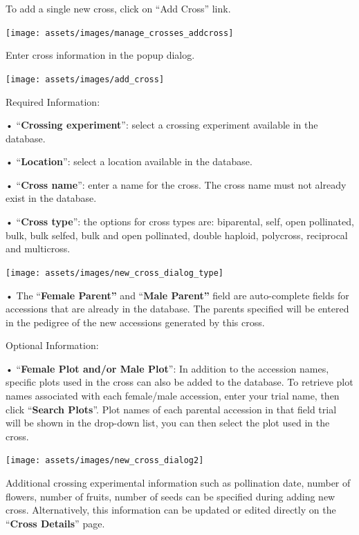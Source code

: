 \documentclass[
  12pt,
]{book}
\begin{document}
To add a single new cross, click on ``Add Cross'' link.

\begin{center}\texttt{[image: assets/images/manage\_crosses\_addcross]} \end{center}

Enter cross information in the popup dialog.

\begin{center}\texttt{[image: assets/images/add\_cross]} \end{center}

Required Information:

• ``\textbf{Crossing experiment}'': select a crossing experiment available in the database.

• ``\textbf{Location}'': select a location available in the database.

• ``\textbf{Cross name}'': enter a name for the cross. The cross name must not already exist in the database.

• ``\textbf{Cross type}'': the options for cross types are: biparental, self, open pollinated, bulk, bulk selfed, bulk and open pollinated, double haploid, polycross, reciprocal and multicross.

\begin{center}\texttt{[image: assets/images/new\_cross\_dialog\_type]} \end{center}

• The ``\textbf{Female Parent''} and ``\textbf{Male Parent''} field are auto-complete fields for accessions that are already in the database. The parents specified will be entered in the pedigree of the new accessions generated by this cross.

Optional Information:

• ``\textbf{Female Plot and/or Male Plot}'': In addition to the accession names, specific plots used in the cross can also be added to the database. To retrieve plot names associated with each female/male accession, enter your trial name, then click ``\textbf{Search Plots}''. Plot names of each parental accession in that field trial will be shown in the drop-down list, you can then select the plot used in the cross.

\begin{center}\texttt{[image: assets/images/new\_cross\_dialog2]} \end{center}

Additional crossing experimental information such as pollination date, number of flowers, number of fruits, number of seeds can be specified during adding new cross. Alternatively, this information can be updated or edited directly on the ``\textbf{Cross Details}'' page.
\end{document}
